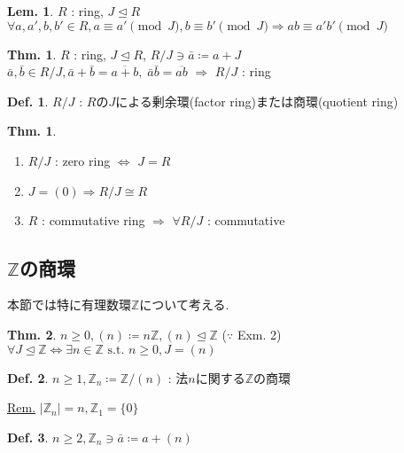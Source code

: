 \documentclass[uplatex,dvipdfmx,9pt]{beamer}
\newcommand{\st}{\text{ s.t. }}
\newcommand{\ideal}{\trianglelefteq}
\newcommand{\Z}{\mathbb{Z}}
\newcommand{\sscount}{\textsection \thesubsection}
\newcounter{textThmCount}
\newcounter{textLemCount}
\newcounter{textExmCount}
\theoremstyle{definition} %
\newtheorem{defn}{Def.}[subsection] %
\newtheorem{thm}{Thm.}[subsection] %
\newtheorem{thmText}[textThmCount]{Thm.}
\newtheorem{lemText}[textLemCount]{Lem.} %
\theoremstyle{example}
\begin{document}
\begin{frame}

  \begin{lemText}
    $R$ : ring, $J \ideal R$ \\
    $\forall a, a', b, b' \in R, a \equiv a' \pmod{J}, b \equiv b' \pmod{J} \Rightarrow ab \equiv a'b' \pmod{J}$
  \end{lemText}

  \begin{thmText}
    $R$ : ring, $J \ideal R$, $R/J \ni \bar{a} \coloneqq a + J$ \\
    $\bar{a}, \bar{b} \in R/J, \bar{a} + \bar{b} = \overline{a + b}, \; \bar{a}\bar{b} = \overline{ab}$ $\Rightarrow$ $R/J$ : ring
  \end{thmText}

  \begin{defn}
    $R/J$ : $R$の$J$による\alert{剰余環(factor ring)}または\alert{商環(quotient ring)}
  \end{defn}

  \begin{thm}
    \begin{enumerate}
      \item $R/J$ : zero ring $\Leftrightarrow$ $J = R$
      \item $J = (0) \Rightarrow R/J \cong R$
      \item $R$ : commutative ring $\Rightarrow$ $\forall R/J$ : commutative
    \end{enumerate}
  \end{thm}

\end{frame}

\subsection{\sscount \texorpdfstring{ $\Z$}{Z}の商環}
\setcounter{textExmCount}{0}

\begin{frame}
  本節では特に有理数環$\Z$について考える.

  \begin{thm}
    $n \ge 0, (n) \coloneqq n\Z, (n) \ideal \Z$ ($\because$  Exm. 2) \\
    $\forall J \ideal \Z \Leftrightarrow \exists n \in \Z \st n \ge 0, J = (n)$
  \end{thm}

  \begin{defn}
    $n \ge 1, \Z_n \coloneqq \Z / (n)$ : 法$n$に関する$\Z$の商環
  \end{defn}
  \underline{Rem.} $|\Z_n| = n, \Z_1 = \{0\}$

  \begin{defn}
    $n \ge 2, \Z_n \ni \bar{a} \coloneqq a + (n)$
  \end{defn}

\end{frame}
\end{document}
